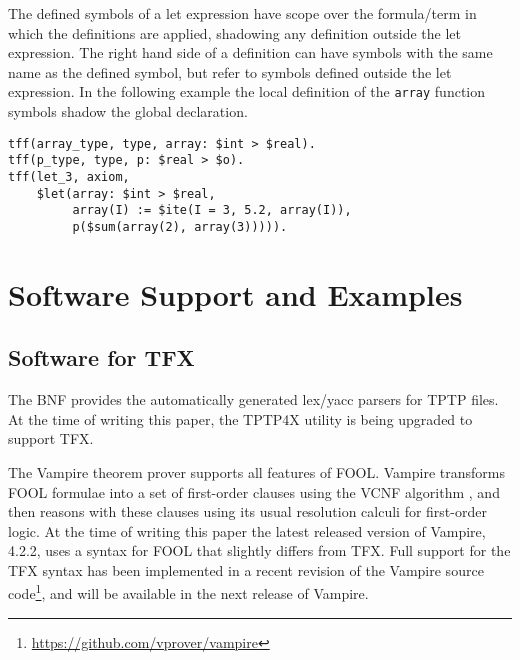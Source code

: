 The defined symbols of a let expression have scope over the formula/term in 
which the definitions are applied, shadowing any definition outside the let 
expression. 
The right hand side of a definition can have symbols with the same name as 
the defined symbol, but refer to symbols defined outside the let expression. 
In the following example the local definition of the \lstinline'array' function 
symbols shadow the global declaration.
\begin{lstlisting}[language=tptp]
tff(array_type, type, array: $int > $real).
tff(p_type, type, p: $real > $o).
tff(let_3, axiom,
    $let(array: $int > $real,
         array(I) := $ite(I = 3, 5.2, array(I)),
         p($sum(array(2), array(3))))).
\end{lstlisting}


\section{Software Support and Examples}
\label{sec:tfx/ImplementationExamples}

\subsection{Software for TFX}
\label{sec:tfx/Software}
The BNF provides the automatically generated lex/yacc parsers for TPTP files.
At the time of writing this paper, the TPTP4X utility is being upgraded
to support TFX.

The Vampire theorem prover \cite{Vampire13} supports all features of FOOL. 
Vampire transforms FOOL formulae into a set of first-order clauses using the 
VCNF algorithm \cite{FOOLCNF}, and then reasons with these clauses using 
its usual resolution calculi for first-order logic. 
At the time of writing this paper the latest released version of Vampire,
4.2.2, uses a syntax for FOOL that slightly differs from TFX. 
Full support for the TFX syntax has been implemented in a recent revision of 
the Vampire source code\footnote{%
\url{https://github.com/vprover/vampire}}, and will be available
in the next release of Vampire.

